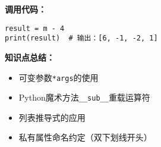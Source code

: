 \begin{mdframed}[linewidth=1pt, linecolor=black]
  \textbf{调用代码：}
  \begin{center}
  \begin{lstlisting}[linewidth=\linewidth]
result = m - 4
print(result)  # 输出：[6, -1, -2, 1]
  \end{lstlisting}
  \end{center}
  \textbf{知识点总结：}
  \begin{itemize}
    \item 可变参数\texttt{*args}的使用
    \item Python魔术方法\texttt{\_\_sub\_\_}重载运算符
    \item 列表推导式的应用
    \item 私有属性命名约定（双下划线开头）
  \end{itemize}

\end{mdframed}